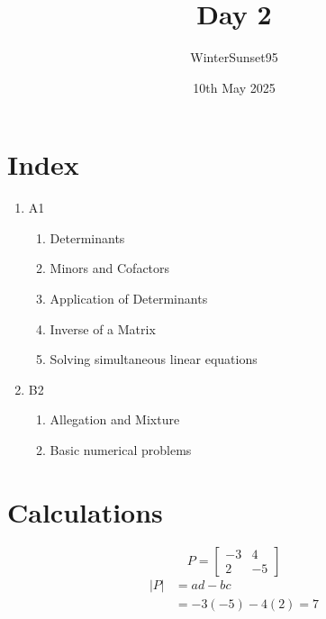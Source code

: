 \documentclass{article}
\title{Day 2}
\author{WinterSunset95}
\date{10th May 2025}
\begin{document}
\maketitle
\section{Index}
\begin{enumerate}
	\item A1
	\begin{enumerate}
		\item Determinants
		\item Minors and Cofactors
		\item Application of Determinants
		\item Inverse of a Matrix
		\item Solving simultaneous linear equations
	\end{enumerate}
	\item B2
	\begin {enumerate}
		\item Allegation and Mixture
		\item Basic numerical problems
	\end{enumerate}
\end{enumerate}

\section{Calculations}
\[
	P = \begin{bmatrix}
		-3 & 4 \\
		2 & -5
	\end{bmatrix}
\]
	\begin{align*}
		|P| &= ad - bc \\
			&= -3(-5) - 4(2) = 7 \\
	\end{align*}
\end{document}
